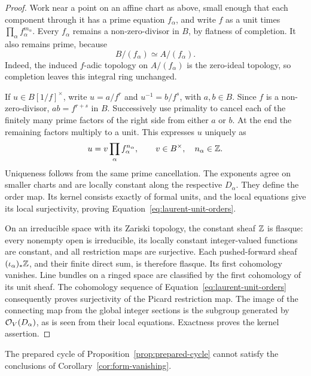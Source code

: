 \begin{proof}
Work near a point on an affine chart as above, small enough that
each component through it has a prime equation \(f_\alpha\),
and write \(f\) as a unit times
\(\prod_\alpha f_\alpha^{m_\alpha}\).
Every \(f_\alpha\) remains a non-zero-divisor in \(B\), by
flatness of completion.  It also remains prime, because
\begin{equation}
 B/(f_\alpha)\simeq A/(f_\alpha).
 \label{eq:prime-completion-quotient}
\end{equation}
Indeed, the induced \(f\)-adic topology on \(A/(f_\alpha)\)
is the zero-ideal topology, so completion leaves this integral
ring unchanged.

If \(u\in B[1/f]^\times\), write
\(u=a/f^r\) and \(u^{-1}=b/f^s\), with \(a,b\in B\).
Since \(f\) is a non-zero-divisor,
\(ab=f^{r+s}\) in \(B\).  Successively use primality to
cancel each of the finitely many prime factors of the right side
from either \(a\) or \(b\).  At the end the remaining factors
multiply to a unit.  This expresses \(u\) uniquely as
\begin{equation}
 u=v\prod_\alpha f_\alpha^{n_\alpha},
 \qquad v\in B^\times,\quad n_\alpha\in\mathbb Z.
 \label{eq:laurent-unit-factorization}
\end{equation}
Uniqueness follows from the same prime cancellation.
The exponents agree on smaller charts and are locally constant
along the respective \(D_\alpha\).  They define the order map.
Its kernel consists exactly of formal units, and the local
equations give its local surjectivity, proving
Equation~\eqref{eq:laurent-unit-orders}.

On an irreducible space with its Zariski topology, the constant
sheaf \(\mathbb Z\) is flasque: every nonempty open is irreducible,
its locally constant integer-valued functions are constant,
and all restriction maps are surjective.  Each pushed-forward
sheaf \((\iota_\alpha)_*\mathbb Z\), and their finite direct sum,
is therefore flasque.  Its first cohomology vanishes.
Line bundles on a ringed space are classified by the first
cohomology of its unit sheaf.  The cohomology sequence of
Equation~\eqref{eq:laurent-unit-orders} consequently proves
surjectivity of the Picard restriction map.  The image of the
connecting map from the global integer sections is the subgroup
generated by \(\mathcal O_V(D_\alpha)\), as is seen from their local
equations.  Exactness proves the kernel assertion.
\end{proof}

\begin{proposition}
\label{prop:laurent-degree-contradiction}
The prepared cycle of Proposition~\ref{prop:prepared-cycle}
cannot satisfy the conclusions of Corollary~\ref{cor:form-vanishing}.
\end{proposition}


